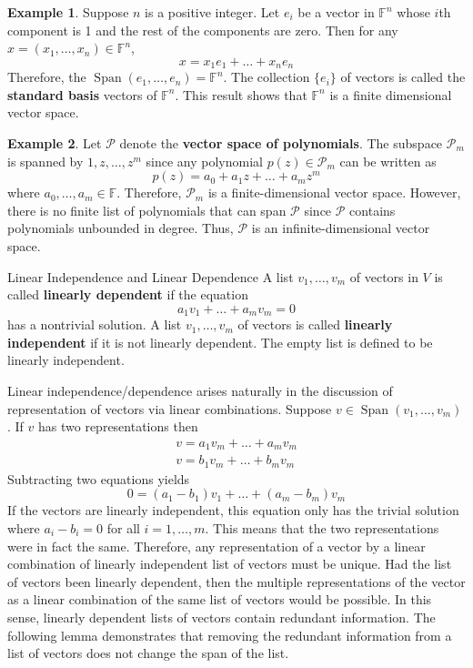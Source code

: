 \documentclass{book}
\newcommand{\field}{\mathbb{F}}
\newcommand{\poly}{\mathcal{P}}
\theoremstyle{definition}
\newtheorem*{example}{Example}
\DeclareMathOperator{\linspan}{Span}
\begin{document}
\begin{example}
    Suppose $n$ is a positive integer. Let $e_i$ be a vector in $\field^n$ whose
    $i$th component is 1 and the rest of the components are zero. Then for any
    $x = (x_1,\dots,x_n) \in \field^n$, 
    \[
        x = x_1e_1+\dots+x_ne_n
    \]
    Therefore, the $\linspan(e_1,\dots,e_n) = \field^n$. The collection
    $\{e_i\}$ of vectors is called the \textbf{standard basis} vectors of
    $\field^n$. This result shows that $\field^n$ is a finite dimensional vector
    space.
\end{example}

\begin{example}
    Let $\poly$ denote the \textbf{vector space of polynomials}. The subspace 
    $\poly_m$ is spanned by $1,z,\dots,z^m$ since any polynomial $p(z) \in 
    \poly_m$ can be written as 
    \[
        p(z) = a_0 + a_1z + \dots + a_mz^m
    \]
    where $a_0,\dots,a_m \in \field$. Therefore, $\poly_m$ is a
    finite-dimensional vector space. However, there is no finite list of
    polynomials that can span $\poly$ since $\poly$ contains polynomials
    unbounded in degree. Thus, $\poly$ is an infinite-dimensional vector space.
\end{example}

\begin{definition}{Linear Independence and Linear Dependence}
    A list $v_1,\dots,v_m$ of vectors in $V$ is called \textbf{linearly
    dependent} if the equation
    \[
        a_1v_1+\dots+a_mv_m = 0
    \]
    has a nontrivial solution. A list $v_1,\dots,v_m$ of vectors is called
    \textbf{linearly independent} if it is not linearly dependent. The empty
    list is defined to be linearly independent.
\end{definition}

\noindent Linear independence/dependence arises naturally in the discussion of
representation of vectors via linear combinations. Suppose $v\in 
\linspan(v_1,\dots,v_m)$. If $v$ has two representations then
\begin{gather*}
    v = a_1v_m + \dots + a_mv_m \\
    v = b_1v_m + \dots + b_mv_m 
\end{gather*}
Subtracting two equations yields
\[
    0 = (a_1-b_1)v_1+\dots+(a_m-b_m)v_m
\]
If the vectors are linearly independent, this equation only has the trivial
solution where $a_i-b_i = 0$ for all $i = 1,\dots,m$. This means that the two
representations were in fact the same. Therefore, any representation of a vector
by a linear combination of linearly independent list of vectors must be unique.
Had the list of vectors been linearly dependent, then the multiple
representations of the vector as a linear combination of the same list of
vectors would be possible. In this sense, linearly dependent lists of vectors
contain redundant information. The following lemma demonstrates that removing
the redundant information from a list of vectors does not change the span of the
list.
\end{document}
